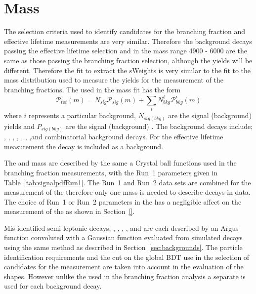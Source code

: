 \section{Mass \pdfs}
\label{sec:ELmasspdfs}
The selection criteria used to identify \bsmumu candidates for the \bmumu branching fraction and \bsmumu effective lifetime measurements are very similar. 
Therefore the background decays passing the \bsmumu effective lifetime selection and in the mass range 4900 - 6000 \mevcc are the same as those passing the branching fraction selection, although the yields will be different.%
Therefore the \ml fit to extract the sWeights is very similar to the fit to the mass distribution used to measure the \bmumu yields for the measurement of the \bmumu branching fractions. The \pdf used in the mass fit has the form
\begin{equation}
\mathcal{P}_{tot}(m) = N_{sig}\mathcal{P}_{sig}(m) + \displaystyle\sum_{i} N^i_{bkg}\mathcal{P}^i_{bkg}(m)
\label{eq:masspdf}
\end{equation}
where $i$ represents a particular background, $N_{sig(bkg)}$ are the signal (background) yields and $P_{sig(bkg)}$ are the signal (background) \pdfs. The background decays include; \bdmumu, \bhh, \lambdab, \bdpimunu, \bsKmunu, \bupimumu, \bdpimumu,\bcjpsimunu and combinatorial background decays. For the effective lifetime measurement the \bdmumu decay is included as a background. 



The \bsmumu and \bdmumu mass \pdfs are described by the same a Crystal ball functions used in the branching fraction measurements, with the Run~1 parameters given in Table~\ref{tab:signalpdfRun1}. The Run~1 and Run~2 data sets are combined for the measurement of the \bsmumu \el therefore only one mass \pdf is needed to describe \bmumu decays in data. The choice of Run~1 or Run~2 parameters in the \pdf has a negligible affect on the measurement of the \bsmumu \el as shown in Section~\ref{}.

Mis-identified semi-leptonic decays, \lambdab, \bdpimunu, \bsKmunu, \bupimumu, \bdpimumu and \bcjpsimunu are each described by an Argus function convoluted with a Gaussian function evaluated from simulated decays using the same method as described in Section~\ref{sec:backgrounds}. The particle identification requirements and the cut on the global BDT use in the selection of candidates for the \el measurement are taken into account in the evaluation of the \pdf shapes. However unlike the \pdfs used in the branching fraction analysis a separate \pdf is used for each background decay. %

